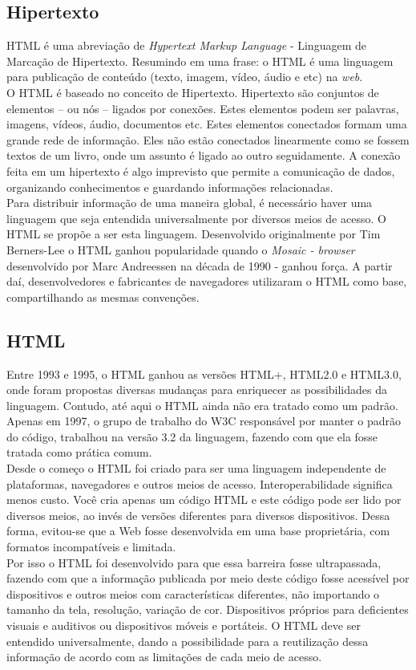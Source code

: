 \subsection{Hipertexto}
HTML é uma abreviação de \textit{Hypertext Markup Language} - Linguagem de Marcação de Hipertexto. Resumindo em uma frase: o HTML é uma linguagem para publicação de conteúdo (texto, imagem, vídeo, áudio e etc) na \textit{web}.\\
O HTML é baseado no conceito de Hipertexto. Hipertexto são conjuntos de elementos – ou nós – ligados por conexões. Estes elementos podem ser palavras, imagens, vídeos, áudio, documentos etc. Estes elementos conectados formam uma grande rede de informação. Eles não estão conectados linearmente como se fossem textos de um livro, onde um assunto é ligado ao outro seguidamente. A conexão feita em um hipertexto é algo imprevisto que permite a comunicação de dados, organizando conhecimentos e guardando informações relacionadas.\\
Para distribuir informação de uma maneira global, é necessário haver uma linguagem que seja entendida universalmente por diversos meios de acesso. O HTML se propõe a ser esta linguagem. 
Desenvolvido originalmente por Tim Berners-Lee o HTML ganhou popularidade quando o \textit{Mosaic - browser} desenvolvido por Marc Andreessen na década de 1990 - ganhou força. A partir daí, desenvolvedores e fabricantes de navegadores utilizaram o HTML como base, compartilhando as mesmas convenções.\\
\subsection{HTML}
Entre 1993 e 1995, o HTML ganhou as versões HTML+, HTML2.0 e HTML3.0, onde foram propostas diversas mudanças para enriquecer as possibilidades da linguagem. Contudo, até aqui o HTML ainda não era tratado como um padrão. Apenas em 1997, o grupo de trabalho do W3C responsável por manter o padrão do código, trabalhou na versão 3.2 da linguagem, fazendo com que ela fosse tratada como prática comum.\\
Desde o começo o HTML foi criado para ser uma linguagem independente de plataformas, navegadores e outros meios de acesso. Interoperabilidade significa menos custo. Você cria apenas um código HTML e este código pode ser lido por diversos meios, ao invés de versões diferentes para diversos dispositivos. Dessa forma, evitou-se que a Web fosse desenvolvida em uma base proprietária, com formatos incompatíveis e limitada.\\
Por isso o HTML foi desenvolvido para que essa barreira fosse ultrapassada, fazendo com que a informação publicada por meio deste código fosse acessível por dispositivos e outros meios com características diferentes, não importando o tamanho da tela, resolução, variação de cor. Dispositivos próprios para deficientes visuais e auditivos ou dispositivos móveis e portáteis. O HTML deve ser entendido universalmente, dando a possibilidade para a reutilização dessa informação de acordo com as limitações de cada meio de acesso.
